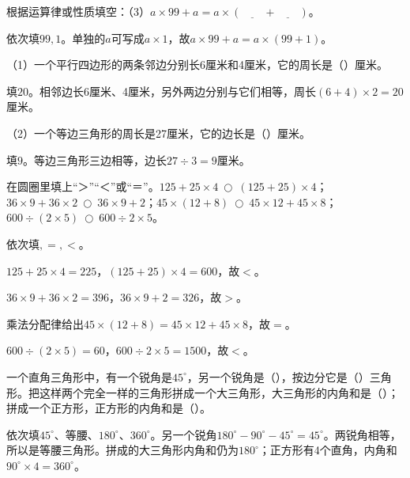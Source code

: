 根据运算律或性质填空：（3）\(a\times99+a=a\times(\underline{\qquad}+\underline{\qquad})\)。\par
\begin{BookAnswer}
依次填\(99,1\)。单独的\(a\)可写成\(a\times1\)，故\(a\times99+a=a\times(99+1)\)。
\end{BookAnswer}

（1）一个平行四边形的两条邻边分别长6厘米和4厘米，它的周长是（\hspace{1.8em}）厘米。\par
\begin{BookAnswer}
填\(20\)。相邻边长6厘米、4厘米，另外两边分别与它们相等，周长\((6+4)\times2=20\)厘米。
\end{BookAnswer}

（2）一个等边三角形的周长是27厘米，它的边长是（\hspace{1.8em}）厘米。\par
\begin{BookAnswer}
填\(9\)。等边三角形三边相等，边长\(27\div3=9\)厘米。
\end{BookAnswer}

在圆圈里填上“＞”“＜”或“＝”。\(125+25\times4\ \bigcirc\ (125+25)\times4\)；\allowbreak{}\(36\times9+36\times2\ \bigcirc\ 36\times9+2\)；\allowbreak{}\(45\times(12+8)\ \bigcirc\ 45\times12+45\times8\)；\allowbreak{}\(600\div(2\times5)\ \bigcirc\ 600\div2\times5\)。\par
\begin{BookAnswer}
依次填\(<,>,=,<\)。\par \(125+25\times4=225\)，\allowbreak{}\((125+25)\times4=600\)，故\(<\)。\par \(36\times9+36\times2=396\)，\allowbreak{}\(36\times9+2=326\)，故\(>\)。\par 乘法分配律给出\(45\times(12+8)=45\times12+45\times8\)，故\(=\)。\par \(600\div(2\times5)=60\)，\allowbreak{}\(600\div2\times5=1500\)，故\(<\)。
\end{BookAnswer}

一个直角三角形中，有一个锐角是\(45^\circ\)，另一个锐角是（\hspace{1.8em}），按边分它是（\hspace{1.8em}）三角形。把这样两个完全一样的三角形拼成一个大三角形，大三角形的内角和是（\hspace{1.8em}）；拼成一个正方形，正方形的内角和是（\hspace{1.8em}）。\par
\begin{BookAnswer}
依次填\(45^\circ\)、等腰、\(180^\circ\)、\(360^\circ\)。另一个锐角\(180^\circ-90^\circ-45^\circ=45^\circ\)。两锐角相等，所以是等腰三角形。拼成的大三角形内角和仍为\(180^\circ\)；正方形有4个直角，内角和\(90^\circ\times4=360^\circ\)。
\end{BookAnswer}

